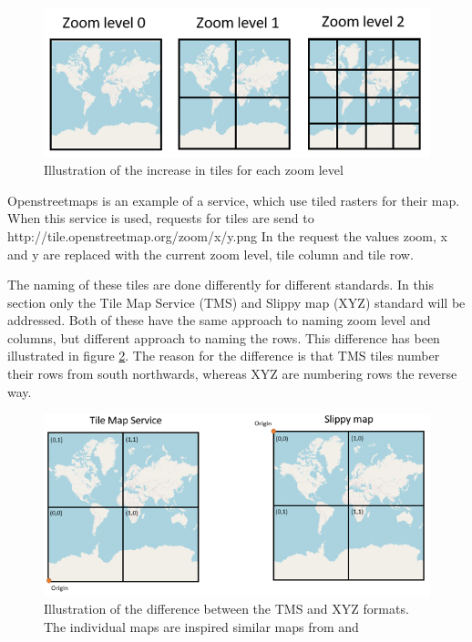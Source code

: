 \begin{figure} [H]
	\centering
	\includegraphics[width=.8\textwidth]{Pictures/TilesPerZoomLevel}
	\caption{Illustration of the increase in tiles for each zoom level}
	\label{TilesPerZoomLevel}
\end{figure}

Openstreetmaps is an example of a service, which use tiled rasters for their map. When this service is used, requests for tiles are send to 
http://tile.openstreetmap.org/zoom/x/y.png
In the request the values zoom, x and y are replaced with the current zoom level, tile column and tile row.
\citep{SlippyMap}


The naming of these tiles are done differently for different standards. In this section only the Tile Map Service (TMS) and Slippy map (XYZ) standard will be addressed. Both of these have the same approach to naming zoom level and columns, but different approach to naming the rows. This difference has been illustrated in figure \ref{TMSXYZ}. The reason for the difference is that TMS tiles number their rows from south northwards, whereas XYZ are numbering rows the reverse way. %
\citep{TMS}

\begin{figure} [H]
	\centering
	\includegraphics[width=.8\textwidth]{Pictures/TMSXYZ}
	\caption{Illustration of the difference between the TMS and XYZ formats. The individual maps are inspired similar maps from \citet{Slippy101} and \citet{TMSnaming}}
	\label{TMSXYZ}
\end{figure}

%
